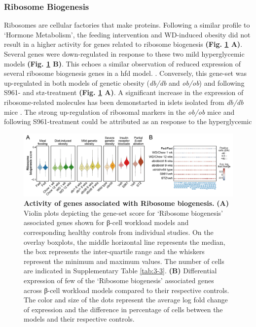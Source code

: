 \subsubsection{Ribosome Biogenesis}
Ribosomes are cellular factories that make proteins. Following a similar profile to `Hormone Metabolism', the feeding intervention and WD-induced obesity did not result in a higher activity for genes related to ribosome biogenesis \textbf{(Fig. \ref{fig:chp3_gs_rb} A)}. Several genes were down-regulated in response to these two mild hyperglycemic models \textbf{(Fig. \ref{fig:chp3_gs_rb} B)}. This echoes a similar observation of reduced expression of several ribosome biogenesis genes in a \gls{hfd} model. \textbf{\cite{hatanaka_chronic_2017}}. Conversely, this gene-set was up-regulated in both models of genetic obesity (\textit{db/db} and \textit{ob/ob}) and following S961- and \gls{stz}-treatment \textbf{(Fig. \ref{fig:chp3_gs_rb} A)}. A significant increase in the expression of ribosome-related molecules has been demonstarted in islets isolated from \textit{db/db} mice \textbf{\cite{asahara_increased_2009}}. The strong up-regulation of ribosomal markers in the \textit{ob/ob} mice and following  S961-treatment could be attributed as an response to the  hyperglycemic 
\begin{figure}[H]
\centering
\includegraphics[width=\linewidth]{Chapter5/Fig/F3-13-03.png}
\caption[Scoring of gene-set - \textit{Ribosome Biogenesis}]{\textbf{Activity of genes associated with Ribosome biogenesis.} \textbf{(A)} Violin plots depicting the gene-set score for `Ribosome biogenesis' associated genes shown for β-cell workload models and corresponding healthy controls from individual studies. On the overlay boxplots, the middle horizontal line represents the median, the box represents the inter-quartile range and the whiskers represent the minimum and maximum values. The number of cells are indicated in Supplementary Table \ref{tab:3-3}. \textbf{(B)} Differential expression of few of the `Ribosome biogenesis' associated genes across β-cell workload models compared to their respective controls. The color and size of the dots represent the average log fold change of expression and the difference in percentage of cells between the models and their respective controls.}
\label{fig:chp3_gs_rb}
\end{figure}

